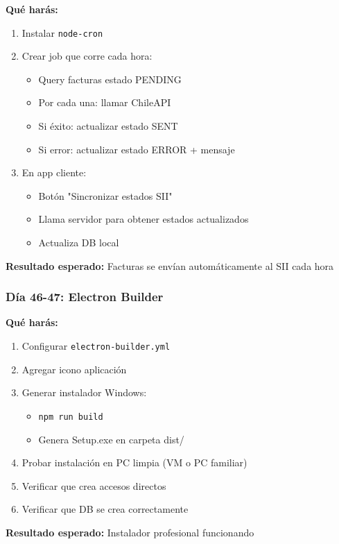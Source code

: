 \documentclass[11pt,a4paper]{article}
\begin{document}
\textbf{Qué harás:}
\begin{enumerate}
    \item Instalar \texttt{node-cron}
    \item Crear job que corre cada hora:
    \begin{itemize}
        \item Query facturas estado PENDING
        \item Por cada una: llamar ChileAPI
        \item Si éxito: actualizar estado SENT
        \item Si error: actualizar estado ERROR + mensaje
    \end{itemize}
    \item En app cliente:
    \begin{itemize}
        \item Botón "Sincronizar estados SII"
        \item Llama servidor para obtener estados actualizados
        \item Actualiza DB local
    \end{itemize}
\end{enumerate}

\textbf{Resultado esperado:} Facturas se envían automáticamente al SII cada hora

\subsubsection{Día 46-47: Electron Builder}

\textbf{Qué harás:}
\begin{enumerate}
    \item Configurar \texttt{electron-builder.yml}
    \item Agregar icono aplicación
    \item Generar instalador Windows:
    \begin{itemize}
        \item \texttt{npm run build}
        \item Genera Setup.exe en carpeta dist/
    \end{itemize}
    \item Probar instalación en PC limpia (VM o PC familiar)
    \item Verificar que crea accesos directos
    \item Verificar que DB se crea correctamente
\end{enumerate}

\textbf{Resultado esperado:} Instalador profesional funcionando
\end{document}
